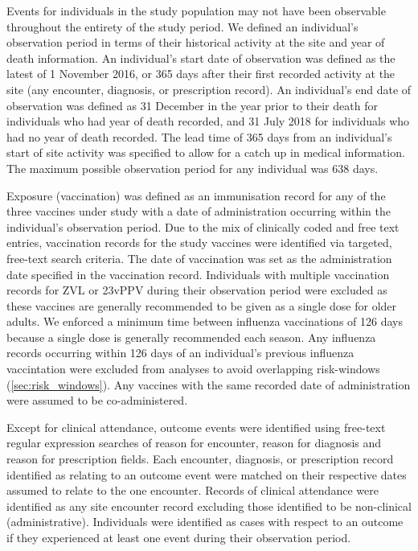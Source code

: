\documentclass[review, endfloat]{elsarticle}
\begin{document}
Events for individuals in the study population may not have been observable throughout the entirety of the study period. We defined an individual’s observation period in terms of their historical activity at the site and year of death information. An individual’s start date of observation was defined as the latest of 1 November 2016, or 365 days after their first recorded activity at the site (any encounter, diagnosis, or prescription record). An individual’s end date of observation was defined as 31 December in the year prior to their death for individuals who had year of death recorded, and 31 July 2018 for individuals who had no year of death recorded. The lead time of 365 days from an individual’s start of site activity was specified to allow for a catch up in medical information. The maximum possible observation period for any individual was 638 days.

Exposure (vaccination) was defined as an immunisation record for any of the three vaccines under study with a date of administration occurring within the individual’s observation period. Due to the mix of clinically coded and free text entries, vaccination records for the study vaccines were identified via targeted, free-text search criteria. The date of vaccination was set as the administration date specified in the vaccination record. Individuals with multiple vaccination records for ZVL or 23vPPV during their observation period were excluded as these vaccines are generally recommended to be given as a single dose for older adults. We enforced a minimum time between influenza vaccinations of 126 days because a single dose is generally recommended each season. Any influenza records occurring within 126 days of an individual’s previous influenza vaccintation were excluded from analyses to avoid overlapping risk-windows (\autoref{sec:risk_windows}). Any vaccines with the same recorded date of administration were assumed to be co-administered.

Except for clinical attendance, outcome events were identified using free-text regular expression searches of reason for encounter, reason for diagnosis and reason for prescription fields. Each encounter, diagnosis, or prescription record identified as relating to an outcome event were matched on their respective dates assumed to relate to the one encounter. Records of clinical attendance were identified as any site encounter record excluding those identified to be non-clinical (administrative).  Individuals were identified as cases with respect to an outcome if they experienced at least one event during their observation period.
\end{document}
